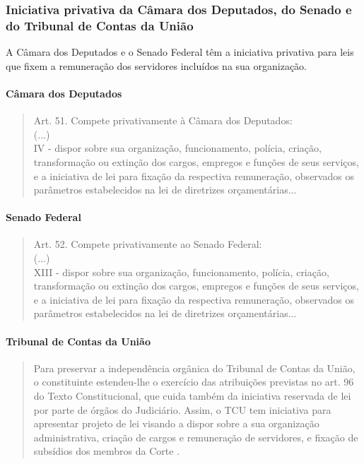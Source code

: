 \documentclass{article}
\begin{document}
\subsubsection{Iniciativa privativa da Câmara dos Deputados, do Senado e do Tribunal de Contas da União}

A Câmara dos Deputados e o Senado Federal têm a iniciativa privativa para leis que fixem a remuneração dos servidores incluídos na sua organização.

\paragraph{Câmara dos Deputados}

\begin{quote}
    Art. 51. Compete privativamente à Câmara dos Deputados:\\
    (...)\\
    IV - dispor sobre sua organização, funcionamento, polícia, criação, transformação ou extinção dos cargos, empregos e funções de seus serviços, e a iniciativa de lei para fixação da respectiva remuneração, observados os parâmetros estabelecidos na lei de diretrizes orçamentárias... \cite{brasil_constituicao_1988}
\end{quote}

\paragraph{Senado Federal}

\begin{quote}
    Art. 52. Compete privativamente ao Senado Federal:\\
    (...)\\
    XIII - dispor sobre sua organização, funcionamento, polícia, criação, transformação ou extinção dos cargos, empregos e funções de seus serviços, e a iniciativa de lei para fixação da respectiva remuneração, observados os parâmetros estabelecidos na lei de diretrizes orçamentárias... \cite{brasil_constituicao_1988}
\end{quote}

\paragraph{Tribunal de Contas da União}

\begin{quote}
    Para preservar a independência orgânica do Tribunal de Contas da União, o constituinte estendeu-lhe o exercício das atribuições previstas no art. 96 do Texto Constitucional, que cuida também da iniciativa reservada de lei por parte de órgãos do Judiciário. Assim, o TCU tem iniciativa para apresentar projeto de lei visando a dispor sobre a sua organização administrativa, criação de cargos e remuneração de servidores, e fixação de subsídios dos membros da Corte \cite[p.~1057]{mendes_curso_2024}.
\end{quote}
\end{document}
